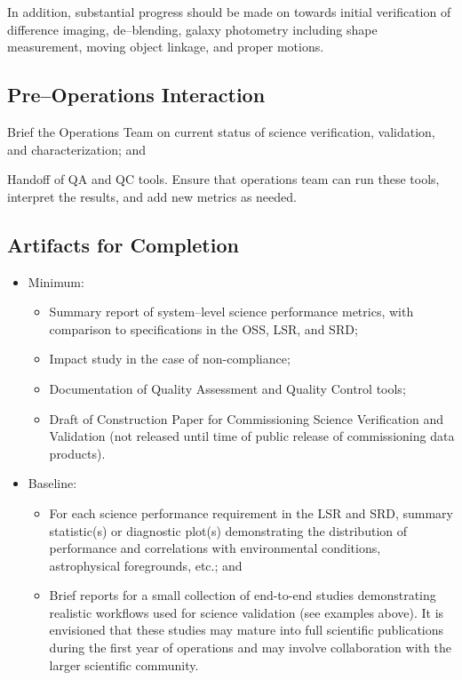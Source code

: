 In addition, substantial progress should be made on towards initial verification of difference imaging, de--blending, galaxy photometry including shape measurement, moving object linkage, and proper motions.

\subsection{Pre--Operations Interaction}

Brief the Operations Team on current status of science verification, validation, and characterization; and

Handoff of QA and QC tools. Ensure that operations team can run these tools, interpret the results, and add new metrics as needed.

\subsection{Artifacts for Completion}

\begin{itemize}

	\item Minimum:
		\begin{itemize}
			\item Summary report of system--level science performance metrics, with comparison to specifications in the OSS, LSR, and SRD;
			\item Impact study in the case of non-compliance;
			\item Documentation of Quality Assessment and Quality Control tools;
			\item Draft of Construction Paper for Commissioning Science Verification and Validation (not released until time of public release of commissioning data products).
		\end{itemize}
		
	\item Baseline:
		\begin{itemize}
			\item For each science performance requirement in the LSR and SRD, summary statistic(s) or diagnostic plot(s) demonstrating the distribution of performance and correlations with environmental conditions, astrophysical foregrounds, etc.; and
			\item Brief reports for a small collection of end-to-end studies demonstrating realistic workflows used for science validation (see examples above). It is envisioned that these studies may mature into full scientific publications during the first year of operations and may involve collaboration with the larger scientific community.
		\end{itemize}
		
	\end{itemize}






